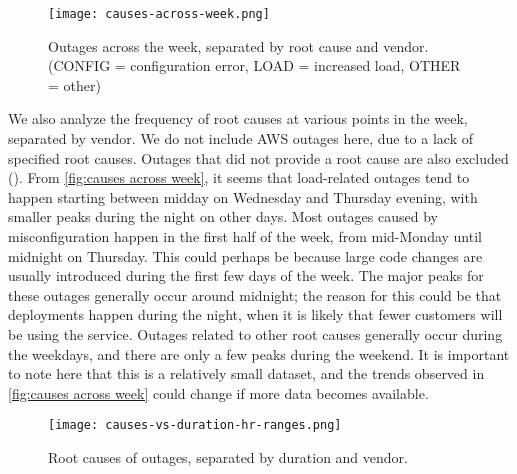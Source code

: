 \begin{figure}[h]
  \centering
  \texttt{[image: causes-across-week.png]}
  \caption{Outages across the week, separated by root cause and vendor. (CONFIG = configuration error, LOAD = increased load, OTHER = other)}
  \label{fig:causes across week}
\end{figure}

We also analyze the frequency of root causes at various points in the week, separated by vendor.
We do not include AWS outages here, due to a lack of specified root causes.
Outages that did not provide a root cause are also excluded ().
From \autoref{fig:causes across week}, it seems that load-related outages tend to happen starting between midday on Wednesday and Thursday evening, with smaller peaks during the night on other days.
Most outages caused by misconfiguration happen in the first half of the week, from mid-Monday until midnight on Thursday.
This could perhaps be because large code changes are usually introduced during the first few days of the week. %
The major peaks for these outages generally occur around midnight; the reason for this could be that deployments happen during the night, when it is likely that fewer customers will be using the service. %
Outages related to other root causes generally occur during the weekdays, and there are only a few peaks during the weekend.
It is important to note here that this is a relatively small dataset, and the trends observed in \autoref{fig:causes across week} could change if more data becomes available.

\begin{figure}[h]
  \centering
  \texttt{[image: causes-vs-duration-hr-ranges.png]}
  \caption{Root causes of outages, separated by duration and vendor.}
  \label{fig:causes vs duration ranges}
\end{figure}

